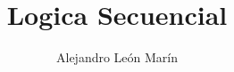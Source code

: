 \documentclass{article}
\title{Logica Secuencial}
\author{Alejandro León Marín}
\begin{document}
    \maketitle

    \tableofcontents

    \newpage

    \begin{center}
        
    \end{center}
    
    \newpage
    
\end{document}
